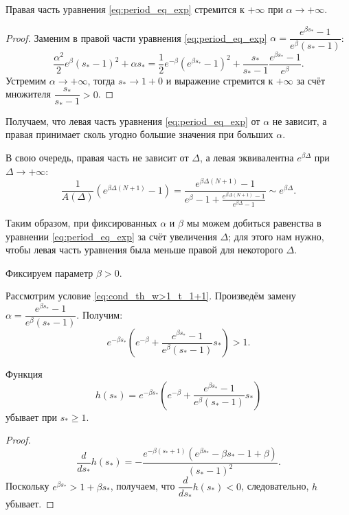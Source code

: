 %
\begin{proposition}
	Правая часть уравнения \eqref{eq:period_eq_exp} стремится к $+\infty$ при $\alpha \to +\infty$.
\end{proposition}
\begin{proof}
	Заменим в правой части уравнения \eqref{eq:period_eq_exp} $\alpha = \dfrac{e^{\beta s_*} - 1}{e^{\beta}(s_* - 1)}$:
	\begin{equation}
		\dfrac{\alpha^2}{2}e^{\beta}( s_* - 1)^2 + \alpha s_* = \dfrac{1}{2}e^{-\beta}(e^{\beta s_*} - 1)^2 + \dfrac{s_*}{s_* - 1}\dfrac{e^{\beta s_*} - 1}{e^{\beta}}.
	\end{equation}
	Устремим $\alpha \to +\infty$, тогда $s_* \to 1 + 0$ и выражение стремится к $+\infty$ за счёт множителя $\dfrac{s_*}{s_* - 1} > 0$.
\end{proof}

Получаем, что левая часть уравнения \eqref{eq:period_eq_exp} от $\alpha$ не зависит, а правая принимает сколь угодно большие значения при больших $\alpha$.

В свою очередь, правая часть не зависит от $\Delta$, а левая эквивалентна $e^{\beta\Delta}$ при $\Delta \to +\infty$:
$$
\dfrac{1}{A(\Delta)}\left(e^{\beta\Delta(N + 1)} - 1\right) = \dfrac{e^{\beta\Delta(N + 1)} - 1}{e^{\beta} - 1 + \frac{e^{\beta\Delta(N + 1)} - 1}{e^{\beta\Delta} - 1}} \sim e^{\beta \Delta}.
$$

Таким образом, при фиксированных $\alpha$ и $\beta$ мы можем добиться равенства в уравнении \eqref{eq:period_eq_exp} за счёт увеличения $\Delta$; для этого нам нужно, чтобы левая часть уравнения была меньше правой для некоторого $\Delta$.

Фиксируем параметр $\beta > 0$.

Рассмотрим условие \eqref{eq:cond_th_w>1_t_1+1}. Произведём замену $\alpha = \dfrac{e^{\beta s_*} - 1}{e^{\beta}(s_* - 1)}$. Получим: 
\begin{equation}
	e^{-\beta  s_*} \left(e^{-\beta} + \frac{e^{\beta s_*} - 1}{e^{\beta}(s_* - 1)}s_*\right) > 1.
\end{equation}
%

\begin{proposition}
	Функция 
	\begin{equation}
		h(s_*) = e^{-\beta  s_*} \left(e^{-\beta} + \frac{e^{\beta s_*} - 1}{e^{\beta}(s_* - 1)}s_*\right)
	\end{equation}
	убывает при $s_* \geqslant 1$.
\end{proposition}
%
\begin{proof}
	\begin{equation}
		\dfrac{d}{ds_*}h(s_*) = -\dfrac{e^{-\beta(s_* + 1)} (e^{\beta s_*} - \beta s_* - 1 + \beta)}{(s_* - 1)^2}.
	\end{equation}
	Поскольку $e^{\beta s_*} > 1 + \beta s_*$, получаем, что $\dfrac{d}{ds_*}h(s_*) < 0$, следовательно, $h$ убывает.
\end{proof}

